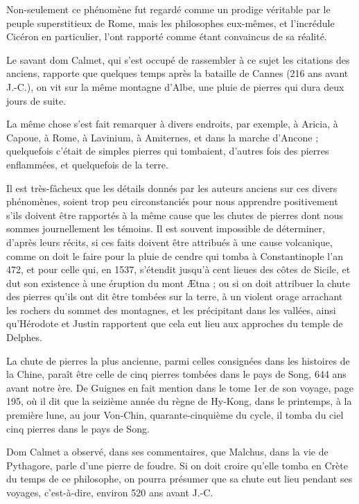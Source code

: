 \documentclass[a4paper, 12pt, oneside, french]{article}
\begin{document}
Non-seulement ce phénomène fut regardé comme un prodige véritable par le peuple superstitieux de Rome, mais les philosophes eux-mêmes, et l'incrédule Cicéron en particulier, l'ont rapporté comme étant convaincus de sa réalité.

Le savant dom Calmet, qui s'est occupé de rassembler à ce sujet les citations des anciens, rapporte que quelques temps après la bataille de Cannes (216 ans avant J.-C.), on vit sur la même montagne d'Albe, une pluie de pierres qui dura deux jours de suite.

La même chose s'est fait remarquer à divers endroits, par exemple, à Aricia, à Capoue, à Rome, à Lavinium, à Amiternes, et dans la marche d'Ancone ; quelquefois c'était de simples pierres qui tombaient, d'autres fois des pierres enflammées, et quelquefois de la terre.

Il est très-fâcheux que les détails donnés par les auteurs anciens sur ces divers phénomènes, soient trop peu circonstanciés pour nous apprendre positivement s'ils doivent être rapportés à la même cause que les chutes de pierres dont nous sommes journellement les témoins. Il est souvent impossible de déterminer, d'après leurs récits, si ces faits doivent être attribués à une cause volcanique, comme on doit le faire pour la pluie de cendre qui tomba à Constantinople l'an 472, et pour celle qui, en 1537, s'étendit jusqu'à cent lieues des côtes de Sicile, et dut son existence à une éruption du mont Ætna ; ou si on doit attribuer la chute des pierres qu'ils ont dit être tombées sur la terre, à un violent orage arrachant les rochers du sommet des montagnes, et les précipitant dans les vallées, ainsi qu'Hérodote et Justin rapportent que cela eut lieu aux approches du temple de Delphes.

La chute de pierres la plus ancienne, parmi celles consignées dans les histoires de la Chine, paraît être celle de cinq pierres tombées dans le pays de Song, 644 ans avant notre ère. De Guignes en fait mention dans le tome 1er de son voyage, page 195, où il dit que la seizième année du règne de Hy-Kong, dans le printemps, à la première lune, au jour Von-Chin, quarante-cinquième du cycle, il tomba du ciel cinq pierres dans le pays de Song.

Dom Calmet a observé, dans ses commentaires, que Malchus, dans la vie de Pythagore, parle d'une pierre de foudre. Si on doit croire qu'elle tomba en Crète du temps de ce philosophe, on pourra présumer que sa chute eut lieu pendant ses voyages, c'est-à-dire, environ 520 ans avant J.-C.
\end{document}
